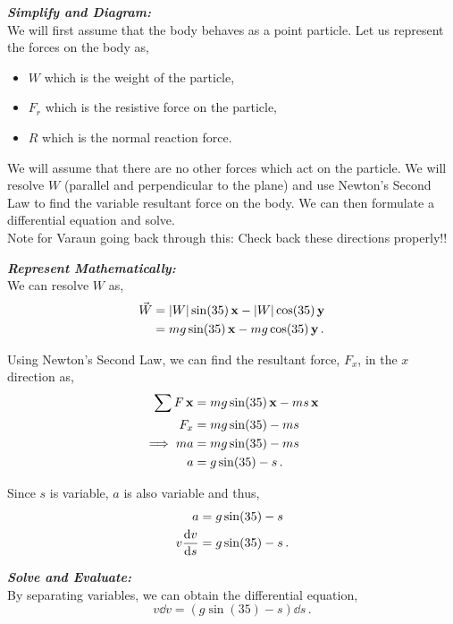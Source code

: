 \begin{subquestions}
\textbf{\textit{Simplify and Diagram:}} \\
We will first assume that the body behaves as a point particle. Let us represent the forces on the body as,
\begin{itemize}
	\item $W$ which is the weight of the particle,
	\item $F_r$ which is the resistive force on the particle,
	\item $R$ which is the normal reaction force.
\end{itemize}
We will assume that there are no other forces which act on the particle. We will resolve $W$ (parallel and perpendicular to the plane) and use Newton's Second Law to find the variable resultant force on the body. We can then formulate a differential equation and solve.\\
Note for Varaun going back through this: Check back these directions properly!!




\textbf{\textit{Represent Mathematically:}} \\
We can resolve $W$ as,
\begin{align}
	\vec{W} & = |W|\sin(35)\,\mathbf{x} - |W|\cos(35)\,\mathbf{y} \nonumber \\
	        & = mg\sin(35)\,\mathbf{x} - mg\cos(35)\,\mathbf{y} \,.
\end{align}

Using Newton's Second Law, we can find the resultant force, $F_x$, in the $x$ direction as,
\begin{align}
	\sum F \,\mathbf{x} & = mg\sin(35)\,\mathbf{x} - ms\,\mathbf{x} \nonumber \\
	    F_x & = mg\sin(35) - ms \nonumber \\
	    \implies ma & = mg\sin(35) - ms \nonumber \\
	    a & = g\sin(35) - s \,.
\end{align}

Since $s$ is variable, $a$ is also variable and thus,
\begin{align}
	a & = g\sin(35) - s \nonumber \\
	v\frac{\mathrm{d}v}{\mathrm{d}s} & = g\sin(35) - s \,.
\end{align}




\textbf{\textit{Solve and Evaluate:}} \\
By separating variables, we can obtain the differential equation,
\begin{equation}
	v\dd v = (g\sin(35) - s) \dd s \,.
\end{equation}


\end{subquestions}
